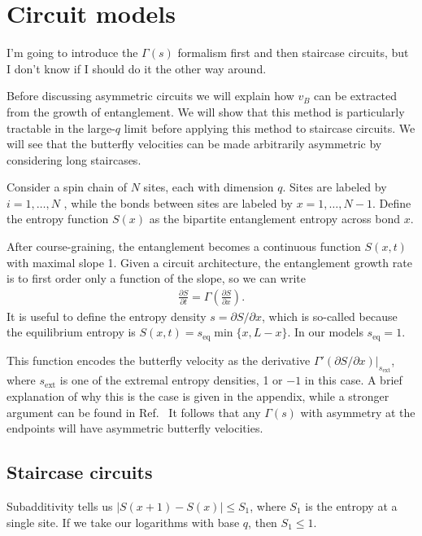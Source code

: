 \documentclass[aps,prx,reprint,superscriptaddress, longbibliography]{revtex4-1}
\newcommand{\charlie}[1]{ {\color{Magenta} {{#1}}}}
\begin{document}
\section{Circuit models} \label{sec:circ}

\charlie{I'm going to introduce the $\Gamma(s)$ formalism first and then staircase circuits, but I don't know if I should do it the other way around.}

Before discussing asymmetric circuits we will explain how $v_B$ can be extracted from the growth of entanglement. We will show that this method is particularly tractable in the large-$q$ limit before applying this method to staircase circuits. We will see that the butterfly velocities can be made arbitrarily asymmetric by considering long staircases.

Consider a spin chain of $N$ sites, each with dimension $q$. Sites are labeled by $i = 1,\dots, N$ , while the bonds between sites are labeled by $x = 1, \dots, N − 1$. Define the entropy function $S(x)$ as the bipartite entanglement entropy across bond $x$. 

After course-graining, the entanglement becomes a continuous function $S(x,t)$ with maximal slope 1. Given a circuit architecture, the entanglement growth rate is to first order only a function of the slope, so we can write \cite{Jonay}
\begin{align}
\frac{\partial S}{\partial t} = \Gamma\left(\frac{\partial S}{\partial x}\right).
\end{align}
It is useful to define the entropy density $s = \partial S / \partial x$, which is so-called because the equilibrium entropy is $S(x, t) = s_\text{eq} \min\{x, L - x\}$. In our models $s_\text{eq} = 1$.

This function encodes the butterfly velocity as the derivative $\Gamma'(\partial S / \partial x)|_{s_\text{ext}}$, where $s_\text{ext}$ is one of the extremal entropy densities, 1 or $-1$ in this case. A brief explanation of why this is the case is given in the appendix, while a stronger argument can be found in Ref.~\cite{Jonay}
It follows that any $\Gamma(s)$ with asymmetry at the endpoints will have asymmetric butterfly velocities.

\subsection{Staircase circuits}

Subadditivity tells us $|S(x + 1) - S(x)| \le S_1$, where $S_1$ is the entropy at a single site. If we take our logarithms with base $q$, then $S_1 \le 1$.
\end{document}
